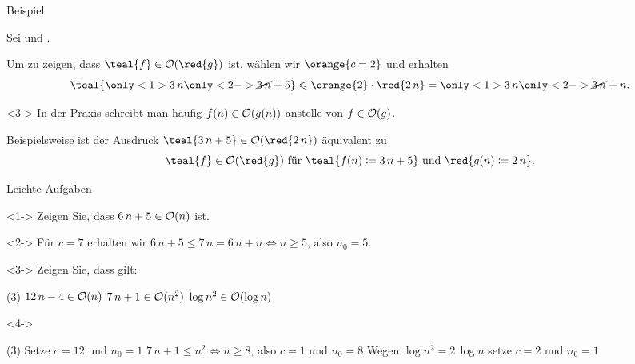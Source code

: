 \begin{frame}{Beispiel}
\begin{example}
Sei  und .

Um zu zeigen, dass $\teal{f} \in \bigO(\red{g})$ ist, w\"ahlen wir {$\orange{c=2}$} und erhalten
\begin{equation*}\label{complexity:ex:bigO1}
    \teal{\only<1>{3 \, n} \only<2->{\cancel{3 \, n}} + 5} \leq \orange{2} \cdot \red{2 \, n} = \only<1>{3 \, n} \only<2->{\cancel{3 \, n}} + n.
\end{equation*}
\end{example}

\begin{remark}<3->
In der Praxis schreibt man h\"aufig $f(n) \in \mathcal{O}(g(n))$ anstelle von $f \in \mathcal{O}(g)$.

Beispielsweise ist der Ausdruck $\teal{3 \, n + 5} \in \bigO(\red{2 \, n})$ \"aquivalent zu $$\teal{f} \in \bigO(\red{g}) \text{ f\"ur } \teal{f(n) \coloneqq 3 \, n + 5} \text{ und } \red{g(n) \coloneqq 2 \, n}.$$
\end{remark}
\end{frame}

\begin{frame}{Leichte Aufgaben}
\begin{task}<1->
Zeigen Sie, dass $6 \, n + 5 \in \mathcal{O}(n)$ ist.
\end{task}
\begin{solution}<2->
F\"ur $c = 7$ erhalten wir $6 \, n + 5 \leq 7 \, n = 6 \, n + n \iff n \geq 5$, also $n_0 = 5$.
\end{solution}

\begin{task}<3->
Zeigen Sie, dass gilt:
\begin{tasks}(3)
    \task $12 \, n - 4 \in \mathcal{O}(n)$
    \task $7 \, n + 1 \in \mathcal{O}(n^2)$
    \task $\log n^2 \in \mathcal{O}(\log n)$ 
\end{tasks}
\end{task}
\begin{solution}<4->
\begin{tasks}(3)
    \task Setze $c=12$ und $n_0=1$
    \task $7 \, n + 1 \leq n^2 \iff n \geq 8$, also $c=1$ und $n_0=8$
    \task Wegen $\log n^2 = 2 \, \log n$ setze $c=2$ und $n_0=1$
\end{tasks}
\end{solution}
\end{frame}


